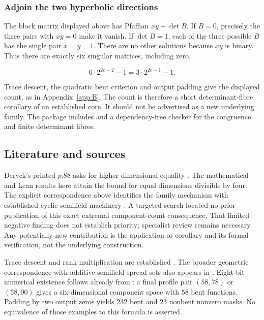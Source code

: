 \documentclass[11pt,a4paper]{article}
\theoremstyle{definition}
\begin{document}
\subsubsection*{Adjoin the two hyperbolic directions}

The block matrix displayed above has Pfaffian $xy+\operatorname{det} B$. If $B=0$, precisely the three pairs with $xy=0$ make it vanish. If $\operatorname{det} B=1$, each of the three possible $B$ has the single pair $x=y=1$. There are no other solutions because $xy$ is binary. Thus there are exactly six singular matrices, including zero.


\begin{equation}\label{eq:199}
6\cdot2^{2e-2}-1=3\cdot2^{2e-1}-1.
\end{equation}

Trace descent, the quadratic bent criterion and output padding give the displayed count, as in Appendix~\ref{app:B}. The count is therefore a short determinant-fibre corollary of an established core. It should not be advertised as a new underlying family. The package includes  and a dependency-free checker for the congruence and finite determinant fibres.


\subsection{Literature and sources}

Deryck's printed $p. 88$ asks for higher-dimensional equality \cite{ref1}. The mathematical and Lean results here attain the bound for equal dimensions divisible by four. The explicit correspondence above identifies the family mechanism with established cyclic-semifield machinery \cite{ref5,ref6}. A targeted search located no prior publication of this exact extremal component-count consequence. That limited negative finding does not establish priority; specialist review remains necessary. Any potentially new contribution is the application or corollary and its formal verification, not the underlying construction.


Trace descent and rank multiplication are established \cite{ref2}. The broader geometric correspondence with additive semifield spread sets also appears in \cite[Theorem 16]{ref4}. Eight-bit numerical existence follows already from \cite[Definition 4.1 and Table 4.1]{ref3}: a final profile pair $(58,78)$ or $(58,90)$ gives a six-dimensional component space with $58$ bent functions. Padding by two output zeros yields $232$ bent and $23$ nonbent nonzero masks. No equivalence of those examples to this formula is asserted.
\end{document}

